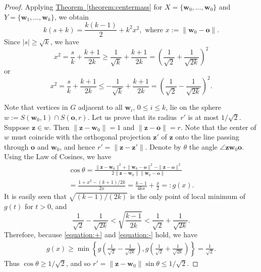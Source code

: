 \documentclass[a4paper, oneside, reqno, 12pt]{amsart}
\theoremstyle{plain}
\theoremstyle{definition}
\begin{document}
\begin{proof}
Applying \hyperref[theorem:centermass]{Theorem~\ref*{theorem:centermass}} for $X=\{\mathbf w_0,\dots,\mathbf w_0\}$ and $Y=\{\mathbf w_1,\dots, \mathbf w_k\}$, we obtain
\[
k(s+k)=\frac{k(k-1)}{2}+k^2x^2, \text{ where $x:=\|\mathbf w_0-\mathbf o\|$.}
\]
Since $|s|\geq \sqrt k$, we have
\begin{equation}
\label{equation:+}
x^2= \frac{s}{k}+\frac{k+1}{2k}\geq\frac{1}{\sqrt{k}}+\frac{k+1}{2k}=\left(\frac{1}{\sqrt{2}}+\frac{1}{\sqrt{2k}}\right)^2
\end{equation}
or
\begin{equation}
\label{equation:-}
x^2= \frac{s}{k}+\frac{k+1}{2k}\leq-\frac{1}{\sqrt{k}}+\frac{k+1}{2k}=\left(\frac{1}{\sqrt{2}}-\frac{1}{\sqrt{2k}}\right)^2.
\end{equation}

Note that vertices in $G$ adjacent to all $\mathbf w_i$, $0\leq i\leq k$, lie on the sphere $w:=S(\mathbf w_0,1)\cap S(\mathbf o, r)$. Let us prove that its radius~$r'$ is at most $1/\sqrt{2}$. Suppose $\mathbf z\in w$. Then $\|\mathbf z - \mathbf w_0\|=1$ and $\|\mathbf z - \mathbf o \| = r$. Note that the center of $w$ must coincide with the orthogonal projection $\mathbf z'$ of $\mathbf z$ onto the line passing through $\mathbf o$ and $\mathbf w_0$, and hence $r'=\|\mathbf z-\mathbf z'\|$. Denote by $\theta$ the angle $\angle \mathbf z \mathbf w_0\mathbf o$. Using the Law of Cosines, we have
\begin{gather*}
\cos \theta=\frac{\|\mathbf z-\mathbf w_0\|^2+\|\mathbf w_0-\mathbf o\|^2-\|\mathbf z-\mathbf o\|^2}{2\|\mathbf z-\mathbf w_0\|\|\mathbf w_0-\mathbf o\|}\\
=\frac{1+x^2-(k+1)/2k}{2x}=\frac{k-1}{4kx}+\frac{x}{2}=:g(x).
\end{gather*}
It is easily seen that $\sqrt{(k-1)/(2k)}$ is the only point of local minimum of $g(t)$ for $t>0$, and
\[
\frac{1}{\sqrt{2}}-\frac{1}{\sqrt{2k}}<\sqrt{\frac{k-1}{2k}}<\frac{1}{\sqrt{2}}+\frac{1}{\sqrt{2k}}.
\]
Therefore, because \eqref{equation:+} and \eqref{equation:-} hold, we have 
\begin{gather*}
	g(x)\geq \min\left\{g\left(\frac{1}{\sqrt{2}}-\frac{1}{\sqrt{2k}}\right),
	g\left(\frac{1}{\sqrt{2}}+\frac{1}{\sqrt{2k}}\right)\right\}=\frac{1}{\sqrt{2}}.
\end{gather*}
Thus $\cos\theta\geq 1/\sqrt{2}$, and so $r'=\|\mathbf z-\mathbf w_0\|\sin \theta \leq 1/\sqrt{2}$.


\end{proof}
\end{document}

